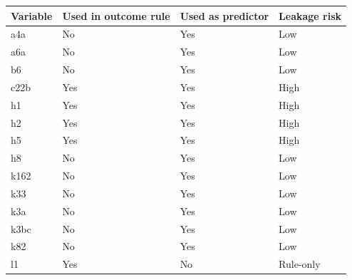 \begin{tabular}{llll}
\toprule
Variable & Used in outcome rule & Used as predictor & Leakage risk \\
\midrule
a4a & No & Yes & Low \\
a6a & No & Yes & Low \\
b6 & No & Yes & Low \\
c22b & Yes & Yes & High \\
h1 & Yes & Yes & High \\
h2 & Yes & Yes & High \\
h5 & Yes & Yes & High \\
h8 & No & Yes & Low \\
k162 & No & Yes & Low \\
k33 & No & Yes & Low \\
k3a & No & Yes & Low \\
k3bc & No & Yes & Low \\
k82 & No & Yes & Low \\
l1 & Yes & No & Rule-only \\
\bottomrule
\end{tabular}
